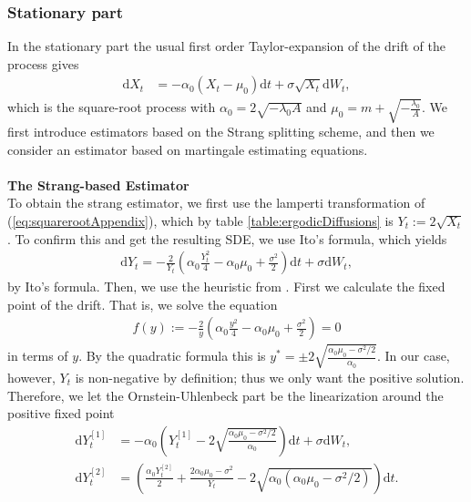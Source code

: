 \subsubsection{Stationary part}\label{subsubsec:squarerootStationary}
In the stationary part the usual first order Taylor-expansion of the drift of the process gives
\begin{align}
    \mathrm{d}X_t &= -\alpha_0\left(X_t - \mu_0\right)\mathrm{d}t + \sigma \sqrt{X_t} \mathrm{d}W_t, \label{eq:squarerootAppendix}
\end{align}
which is the square-root process with $\alpha_0 = 2\sqrt{-\lambda_0A}$ and $\mu_0 = m + \sqrt{-\frac{\lambda_0}{A}}$. 
We first introduce estimators based on the Strang splitting scheme, and then we consider an estimator based on martingale estimating equations.\\\\
\noindent \textbf{The Strang-based Estimator}\\
To obtain the strang estimator, we first use the lamperti transformation of (\ref{eq:squarerootAppendix}), which by table \ref{table:ergodicDiffusions} is $Y_t := 2\sqrt{X_t}$. To confirm this and get the resulting SDE, we use Ito's formula, which yields
\begin{align}
    \mathrm{d}Y_t = - \frac{2}{Y_t}\left(\alpha_0 \frac{Y_t^2}{4} - \alpha_0 \mu_0 + \frac{\sigma^2}{2}\right)\mathrm{d}t + \sigma \mathrm{d}W_t, \label{eq:lampertiSquarerootAppendix}
\end{align}
by Ito's formula. Then, we use the heuristic from \cite[section 2.3 and 2.5]{SplittingSchemes}. First we calculate the fixed point of the drift. That is, we solve the equation
\begin{align}
    f(y) := - \frac{2}{y}\left(\alpha_0 \frac{y^2}{4} - \alpha_0 \mu_0 + \frac{\sigma^2}{2}\right) = 0
\end{align}
in terms of $y$. By the quadratic formula this is $y^* = \pm 2\sqrt{\frac{\alpha_0\mu_0 - \sigma^2 / 2}{\alpha_0}}$. In our case, however, $Y_t$ is non-negative by definition; thus we only want the positive solution. Therefore, we let the Ornstein-Uhlenbeck part be the linearization around the positive fixed point
\begin{align}
    \mathrm{d}Y_t^{[1]} &= -\alpha_0 \left(Y_t^{[1]} - 2\sqrt{\frac{\alpha_0\mu_0 - \sigma^2 / 2}{\alpha_0}}\right)\mathrm{d}t + \sigma \mathrm{d}W_t , \label{eq:squarerootStationarySplit1} \\
    \mathrm{d}Y_t^{[2]} &= \left(\frac{\alpha_0 Y_t^{[2]}}{2} + \frac{2\alpha_0 \mu_0 - \sigma^2}{Y_t} - 2\sqrt{\alpha_0\left(\alpha_0\mu_0 - \sigma^2 / 2\right)}\right)\mathrm{d}t. \label{eq:squarerootStationarySplit2}
\end{align}
